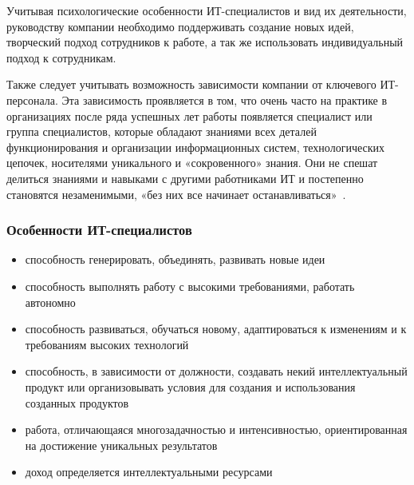 \documentclass{../industrial-development}
\begin{document}
	Учитывая психологические особенности ИТ-специалистов и вид их деятельности, руководству компании необходимо поддерживать создание новых идей, творческий подход сотрудников к работе, а так же использовать индивидуальный подход к сотрудникам.
	
	Также следует учитывать возможность зависимости компании от ключевого ИТ-персонала. Эта зависимость проявляется в том, что очень часто на практике в организациях после ряда успешных лет работы появляется специалист или группа специалистов, которые обладают знаниями всех деталей функционирования и организации информационных систем, технологических цепочек, носителями уникального и «сокровенного» знания. Они не спешат делиться знаниями и навыками с другими работниками ИТ и постепенно становятся незаменимыми, «без них все начинает останавливаться»~\cite[с.~51--52]{Tutunik}.
	
	\begin{frame} \frametitle{Особенности ИТ-специалистов}
		
		\begin{itemize}
			\item способность генерировать, объединять, развивать новые идеи
			\item способность выполнять работу с высокими требованиями, работать автономно
			\item способность развиваться, обучаться новому, адаптироваться к изменениям и к требованиям высоких технологий
			\item способность, в зависимости от должности, создавать некий интеллектуальный продукт или организовывать условия для создания и использования созданных продуктов
			\item работа, отличающаяся многозадачностью и интенсивностью, ориентированная на достижение уникальных результатов
			\item доход определяется интеллектуальными ресурсами
			
		\end{itemize}
	\end{frame}
	\lecturenotes
	
\end{document}
